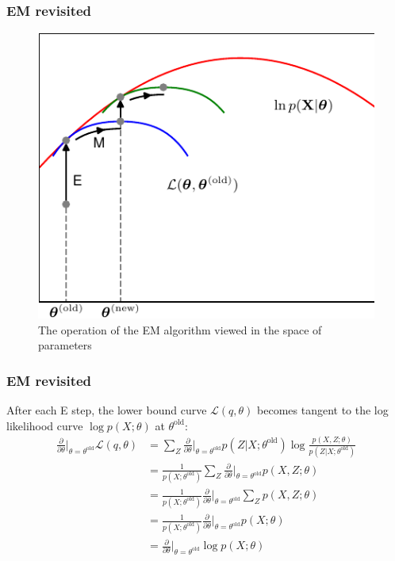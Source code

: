 \documentclass{beamer}
\begin{document}
\begin{frame}
    \frametitle{EM revisited}
    \begin{figure}
        \caption{The operation of the EM algorithm viewed in the space of parameters}
        \includegraphics[height=0.7\textheight]{Figure_16.pdf}
    \end{figure}
\end{frame}

\begin{frame}
    \frametitle{EM revisited}
    After each E step, the lower bound curve $\mathcal{L}(q,\theta)$ becomes tangent to the log likelihood curve $\log{}p(X;\theta)$ at $\theta^{\textrm{old}}$:
    \begin{align*}
        \frac{\partial}{\partial\theta}\bigg|_{\theta=\theta^{\textrm{old}}}\mathcal{L}(q,\theta)&=\sum_{Z}\frac{\partial}{\partial\theta}\bigg|_{\theta=\theta^{\textrm{old}}}p(Z|X;\theta^{\textrm{old}})\log\frac{p(X,Z;\theta)}{p(Z|X;\theta^{\textrm{old}})} \\
        &=\frac{1}{p(X;\theta^{\textrm{old}})}\sum_{Z}\frac{\partial}{\partial\theta}\bigg|_{\theta=\theta^{\textrm{old}}}p(X,Z;\theta) \\
        &=\frac{1}{p(X;\theta^{\textrm{old}})}\frac{\partial}{\partial\theta}\bigg|_{\theta=\theta^{\textrm{old}}}\sum_{Z}p(X,Z;\theta) \\
        &=\frac{1}{p(X;\theta^{\textrm{old}})}\frac{\partial}{\partial\theta}\bigg|_{\theta=\theta^{\textrm{old}}}p(X;\theta) \\
        &=\frac{\partial}{\partial\theta}\bigg|_{\theta=\theta^{\textrm{old}}}\log{}p(X;\theta)
    \end{align*}
\end{frame}
\end{document}
